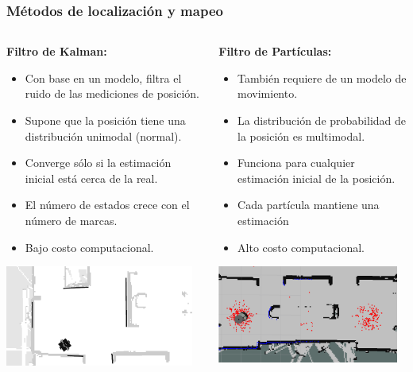 \documentclass[10pt,spanish,aspectratio=1610]{beamer}
\begin{document}
\begin{frame}\frametitle{Métodos de localización y mapeo}
  \begin{columns}
    \begin{column}{0.45\textwidth}
      \textbf{Filtro de Kalman:} 
      \begin{itemize}
      \item Con base en un modelo, filtra el ruido de las mediciones de posición.
      \item Supone que la posición tiene una distribución unimodal (normal).
      \item Converge sólo si la estimación inicial está cerca de la real.
      \item El número de estados crece con el número de marcas.
      \item Bajo costo computacional.
      \end{itemize}
      \includegraphics[width=0.95\textwidth]{Figures/LineExtractionLines.png}
    \end{column}
    \begin{column}{0.45\textwidth}
      \textbf{Filtro de Partículas:}
      \begin{itemize}
      \item También requiere de un modelo de movimiento.
      \item La distribución de probabilidad de la posición es multimodal.
      \item Funciona para cualquier estimación inicial de la posición.
        \item Cada partícula mantiene una estimación
      \item Alto costo computacional.
      \end{itemize}
      \includegraphics[width=0.95\textwidth]{Figures/ParticleFilter.png}
    \end{column}
  \end{columns}
\end{frame}
\end{document}
